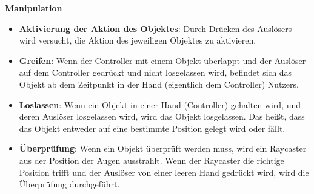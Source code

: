   \textbf{Manipulation}
  \begin{itemize}
  \item \textbf{Aktivierung der Aktion des Objektes}: Durch Drücken des Auslösers wird versucht, die Aktion des jeweiligen Objektes zu aktivieren.
  \item \textbf{Greifen}: Wenn der Controller mit einem Objekt überlappt und der Auslöser auf dem Controller gedrückt und nicht losgelassen wird, befindet sich das Objekt ab dem Zeitpunkt in der Hand (eigentlich dem Controller) Nutzers.
  \item \textbf{Loslassen}: Wenn ein Objekt in einer Hand (Controller) gehalten wird, und deren Auslöser losgelassen wird, wird das Objekt losgelassen. Das heißt, dass das Objekt entweder auf eine bestimmte Position gelegt wird oder fällt.
  \item \textbf{Überprüfung}: Wenn ein Objekt überprüft werden muss, wird ein Raycaster aus der Position der Augen ausstrahlt. Wenn der Raycaster die richtige Position trifft und der Auslöser von einer leeren Hand gedrückt wird, wird die Überprüfung durchgeführt.
  \end{itemize}
  
